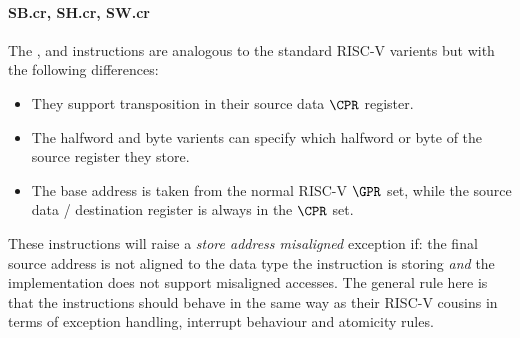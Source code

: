 
\paragraph{SB.cr, SH.cr, SW.cr}

The ,  and  instructions are analogous to
the standard RISC-V varients but with the following differences:

\begin{itemize}
\item They support transposition in their source data $\CPR$ register.
\item The halfword and byte varients can specify which halfword or byte of
      the source register they store.
\item The base address is taken from the normal RISC-V $\GPR$ set, while the
      source data / destination register is always in the $\CPR$ set.
\end{itemize}

These instructions will raise a {\em store address misaligned} exception
if: the final source address is not aligned to the data type the instruction
is storing {\em and} the implementation does not support misaligned accesses.
The general rule here is that the  instructions should behave in
the same way as their RISC-V cousins in terms of exception handling,
interrupt behaviour and atomicity rules.


